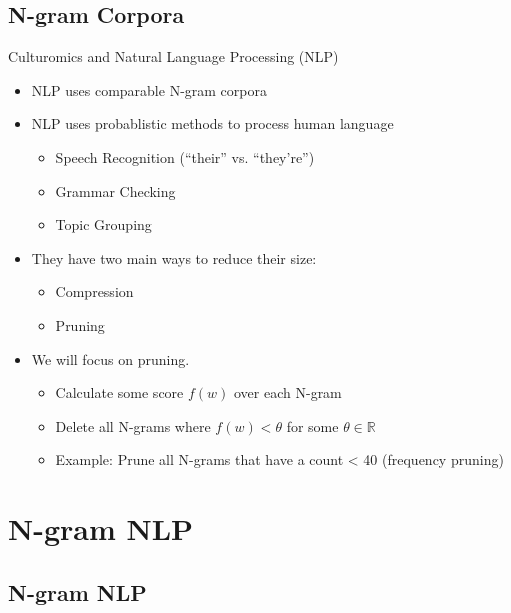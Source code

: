 \documentclass[16:9,en,navbarinfooter]{sdqbeamer}
\begin{document}
\subsection{N-gram Corpora}
\begin{frame}[fragile]{Culturomics and Natural Language Processing (NLP)}
\begin{itemize}
    \item NLP uses comparable N-gram corpora
    \item NLP uses probablistic methods to process human language
    \begin{itemize}
        \item Speech Recognition (``their'' vs. ``they're'')
        \item Grammar Checking 
        \item Topic Grouping 
    \end{itemize}
    \item They have two main ways to reduce their size:
    \begin{itemize}
            \item Compression
            \item Pruning
    \end{itemize}
    \item We will focus on pruning.
        \begin{itemize}
                \item Calculate some score $f(w)$ over each N-gram 
                \item Delete all N-grams where $f(w) < \theta$ for some $\theta \in \mathbb R$
                \item Example: Prune all N-grams that have a count < 40 (frequency pruning)
        \end{itemize}
\end{itemize}
\end{frame}

\section{N-gram NLP}
\subsection{N-gram NLP} 
\end{document}
